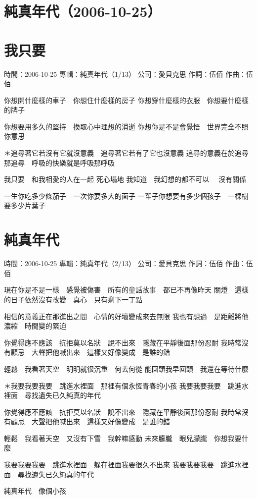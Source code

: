 \documentclass[UTF8,a4paper,oneside,twocolumn,12pt]{ctexbook}
\newcommand{\infopair}[2]{\textbullet #1：#2}
\newcommand{\zc}[1][伍佰]{\infopair{作詞}{#1}}
\newcommand{\zq}[1][伍佰]{\infopair{作曲}{#1}}
\newcommand{\zj}[1]{\infopair{專輯}{#1}}
\newcommand{\sj}[1]{\infopair{時間}{#1}}
\newcommand{\gs}[1]{\infopair{公司}{#1}}
\newenvironment{info}{\begin{flushleft}\kaishu
	}
	{\end{flushleft}\normalsize\yahei\par}
\newenvironment{lyric}{
	}
{}
\begin{document}
\section*{純真年代（2006-10-25）}
\section{我只要}
\begin{info}
	\sj{2006-10-25}
	\zj{純真年代（1/13）}
	\gs{愛貝克思}
	\zc
	\zq
\end{info}
\begin{lyric}
	你想開什麼樣的車子　你想住什麼樣的房子
	你想穿什麼樣的衣服　你想要什麼樣的牌子

	你想要用多久的堅持　換取心中理想的消逝
	你想你是不是會覺悟　世界完全不照你意思

	＊追尋著它若沒有它就沒意義　追尋著它若有了它也沒意義
	追尋的意義在於追尋那追尋　呼吸的快樂就是呼吸那呼吸

	我只要　和我相愛的人在一起 死心塌地
	我知道　我幻想的都不可以　 沒有關係

	一生你吃多少條茄子　一次你要多大的面子
	一輩子你想要有多少個孩子　一棵樹要多少片葉子
\end{lyric}

\section{純真年代}
\begin{info}
	\sj{2006-10-25}
	\zj{純真年代（2/13）}
	\gs{愛貝克思}
	\zc
	\zq
\end{info}
\begin{lyric}
	現在你是不是一樣　感覺被傷害　所有的童話故事　都已不再像昨天
	關燈　這樣的日子依然沒有改變　真心　只有剩下一丁點

	相信的意義正在那進出之間　心情的好壞變成來去無限
	我也有想過　是距離將他濃縮　時間變的緊迫

	你覺得應不應該　抗拒莫以名狀　說不出來　隱藏在平靜後面那份忍耐
	我時常沒有顧忌　大聲把他喊出來　這樣又好像變成　是誰的錯

	輕鬆　我看著天空　明明就很沉重　何去何從
	能回頭我早回頭　我還在等待什麼

	＊我要我要我要　跳進水裡面　那裡有個永恆青春的小孩
	我要我要我要　跳進水裡面　尋找遺失已久純真的年代

	你覺得應不應該　抗拒莫以名狀　說不出來　隱藏在平靜後面那份忍耐
	我時常沒有顧忌　大聲把他喊出來　這樣又好像變成　是誰的錯

	輕鬆　我看著天空　又沒有下雪　我幹嘛感動
	未來朦朧　眼兒朦朧　你想我要什麼

	我要我要我要　跳進水裡面　躲在裡面我要很久不出來
	我要我要我要　跳進水裡面　尋找遺失已久純真的年代

	純真年代　像個小孩
\end{lyric}
\end{document}
